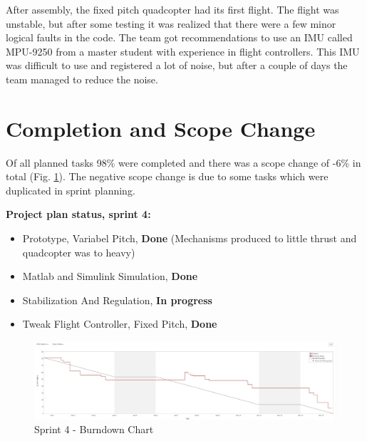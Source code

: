 After assembly, the fixed pitch quadcopter had its first flight. The flight was unstable, but after some testing it was realized that there were a few minor logical faults in the code. The team got recommendations to use an IMU called MPU-9250 from a master student with experience in flight controllers. This IMU was difficult to use and registered a lot of noise, but after a couple of days the team managed to reduce the noise.

\clearpage

\section{Completion and Scope Change}

Of all planned tasks 98\%  were completed and there was a scope change of -6\% in total (Fig. \ref{fig:bds4}). The negative scope change is due to some tasks which were duplicated in sprint planning.

\textbf{Project plan status, sprint 4:}
        
    \begin{itemize}
        \item Prototype, Variabel Pitch, \textbf{Done} (Mechanisms produced to little thrust and quadcopter was to heavy)
        \item Matlab and Simulink Simulation, \textbf{Done}
        \item Stabilization And Regulation, \textbf{In progress}
        \item Tweak Flight Controller, Fixed Pitch, \textbf{Done}
    \end{itemize}
        
        

\begin{figure}[h]
    \centering
         \includegraphics[width = 1\textwidth]{VAPIQ-PICTURES/BDSprint4}
      \caption{Sprint 4 - Burndown Chart}
    \label{fig:bds4}
\end{figure} 




